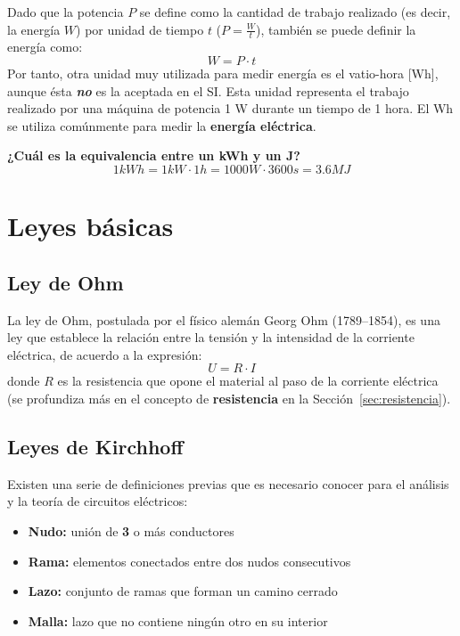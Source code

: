 	Dado que la potencia $P$ se define como la cantidad de trabajo
        realizado (es decir, la energía $W$) por unidad de tiempo $t$
        ($P=\frac{W}{t}$), también se puede definir la energía como:
	\begin{equation*}\label{eq:Ept}
          W=P\cdot t
	\end{equation*}
	Por tanto, otra unidad muy utilizada para medir energía es el
        vatio-hora [Wh], aunque ésta \textbf{\emph{no}} es la aceptada
        en el SI. Esta unidad representa el trabajo realizado por una
        máquina de potencia 1 W durante un tiempo de 1 hora. El Wh se
        utiliza comúnmente para medir la \textbf{energía eléctrica}.
	
	\vspace{4mm}
	\begin{example}
          \textbf{¿Cuál es la equivalencia entre un kWh y un J?}
          \begin{equation*}
            1 kWh = 1 kW \cdot 1 h = 1000 W \cdot 3600 s = 3.6 MJ 
          \end{equation*}
	\end{example}
	
	\section{Leyes básicas}
	
	\subsection{Ley de Ohm}
	
	La ley de Ohm, postulada por el físico alemán Georg Ohm
        (1789--1854), es una ley que establece la relación entre la
        tensión y la intensidad de la corriente eléctrica, de acuerdo
        a la expresión:
	\begin{equation}
          \boxed{ U=R\cdot I}
	\end{equation}
        donde $R$ es la resistencia que opone el material al paso de
        la corriente eléctrica (se profundiza más en el concepto de
        \textbf{resistencia} en la Sección~\ref{sec:resistencia}).
	
	\subsection{Leyes de Kirchhoff}
	
	Existen una serie de definiciones previas que es necesario
        conocer para el análisis y la teoría de circuitos eléctricos:
	\begin{itemize}
        \item \textbf{Nudo:} unión de \textbf{3} o más conductores
        \item \textbf{Rama:} elementos conectados entre dos nudos
          consecutivos
        \item \textbf{Lazo:} conjunto de ramas que forman un camino
          cerrado
        \item \textbf{Malla:} lazo que no contiene ningún otro en su
          interior
	\end{itemize}

